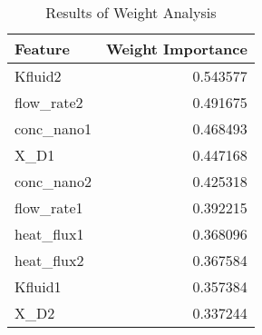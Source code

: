 
        \begin{table*}
            \centering
            \begin{tabular}{lr}
\hline
 Feature     &   Weight Importance \\
\hline
 Kfluid2     &            0.543577 \\
 flow\_rate2 &            0.491675 \\
 conc\_nano1 &            0.468493 \\
 X\_D1       &            0.447168 \\
 conc\_nano2 &            0.425318 \\
 flow\_rate1 &            0.392215 \\
 heat\_flux1 &            0.368096 \\
 heat\_flux2 &            0.367584 \\
 Kfluid1     &            0.357384 \\
 X\_D2       &            0.337244 \\
\hline
\end{tabular}
            \caption{Results of Weight Analysis}
            \label{table-weight_analysis}
        \end{table*}
        
